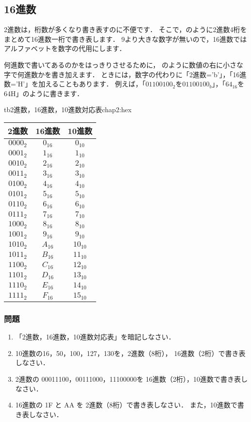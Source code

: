 \subsection{16進数}

2進数は，桁数が多くなり書き表すのに不便です．
そこで，のように2進数4桁をまとめて16進数一桁で書き表します．
9より大きな数字が無いので，16進数ではアルファベットを数字の代用にします．

何進数で書いてあるのかをはっきりさせるために，
のように数値の右に小さな字で何進数かを書き加えます．
ときには，数字の代わりに「2進数='b'」，「16進数='H'」を加えることもあります．
例えば，「$01100100_2$を$01100100_b$」，「$64_{16}$を64H」のように書きます．

\begin{mytable}{tb}{2進数，16進数，10進数対応表}{chap2:hex}
{\small\begin{tabular}{ c | c | c }
\hline
\hline
{\bf 2進数} & {\bf 16進数} & {\bf 10進数} \\
\hline
$0000_2$ & $0_{16}$ & $0_{10}$ \\
$0001_2$ & $1_{16}$ & $1_{10}$ \\
$0010_2$ & $2_{16}$ & $2_{10}$ \\
$0011_2$ & $3_{16}$ & $3_{10}$ \\
$0100_2$ & $4_{16}$ & $4_{10}$ \\
$0101_2$ & $5_{16}$ & $5_{10}$ \\
$0110_2$ & $6_{16}$ & $6_{10}$ \\
$0111_2$ & $7_{16}$ & $7_{10}$ \\
$1000_2$ & $8_{16}$ & $8_{10}$ \\
$1001_2$ & $9_{16}$ & $9_{10}$ \\
$1010_2$ & $A_{16}$ & $10_{10}$ \\
$1011_2$ & $B_{16}$ & $11_{10}$ \\
$1100_2$ & $C_{16}$ & $12_{10}$ \\
$1101_2$ & $D_{16}$ & $13_{10}$ \\
$1110_2$ & $E_{16}$ & $14_{10}$ \\
$1111_2$ & $F_{16}$ & $15_{10}$ \\
\end{tabular}}
\end{mytable}

\begin{flushleft}
\subsubsection{問題}
\begin{enumerate}
\item
{}「2進数，16進数，10進数対応表」を暗記しなさい．
\item
10進数の16，50，100，127，130を，2進数（8桁），
16進数（2桁）で書き表しなさい．
\item
2進数の 00011100，00111000，11100000を
16進数（2桁），10進数で書き表しなさい．
\item
16進数の 1F と AA を
2進数（8桁）で書き表しなさい．
また，10進数で書き表しなさい．
\end{enumerate}
\end{flushleft}

